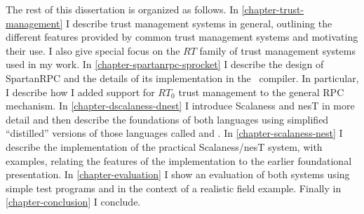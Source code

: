 The rest of this dissertation is organized as follows. In \autoref{chapter-trust-management} I
describe trust management systems in general, outlining the different features provided by
common trust management systems and motivating their use. I also give special focus on the $RT$
family of trust management systems used in my work. In \autoref{chapter-spartanrpc-sprocket} I
describe the design of SpartanRPC and the details of its implementation in the \Sprocket\
compiler. In particular, I describe how I added support for $RT_0$ trust management to the
general RPC mechanism. In \autoref{chapter-dscalaness-dnest} I introduce Scalaness and nesT in
more detail and then describe the foundations of both languages using simplified ``distilled''
versions of those languages called \newterm{DScalaness} and \newterm{DnesT}. In
\autoref{chapter-scalaness-nest} I describe the implementation of the practical Scalaness/nesT
system, with examples, relating the features of the implementation to the earlier foundational
presentation. In \autoref{chapter-evaluation} I show an evaluation of both systems using simple
test programs and in the context of a realistic field example. Finally in
\autoref{chapter-conclusion} I conclude.

